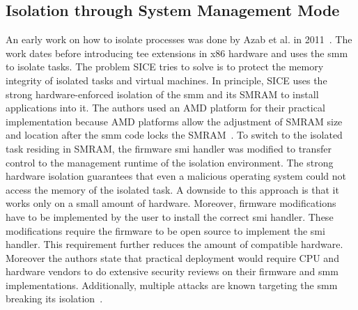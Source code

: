 \subsection{Isolation through System Management Mode}
\label{sec:20:isolation_smm}
An early work on how to isolate processes was done by Azab et al. in
2011~\cite{azab_sice_2011}. The work dates before introducing \gls{tee}
extensions in x86 hardware and uses the \gls{smm} to isolate tasks. The problem
SICE tries to solve is to protect the memory integrity of isolated tasks and
virtual machines. In principle, SICE uses the strong hardware-enforced isolation
of the \gls{smm} and its SMRAM to install applications into it. The authors used
an AMD platform for their practical implementation because AMD platforms allow
the adjustment of SMRAM size and location after the \gls{smm} code locks the
SMRAM~\cite{bios2014amd}. To switch to the isolated task residing in SMRAM, the
firmware \gls{smi} handler was modified to transfer control to the management
runtime of the isolation environment. The strong hardware isolation guarantees
that even a malicious operating system could not access the memory of the
isolated task. A downside to this approach is that it works only on a small
amount of hardware. Moreover, firmware modifications have to be implemented by
the user to install the correct \gls{smi} handler. These modifications require
the firmware to be open source to implement the \gls{smi} handler. This
requirement further reduces the amount of compatible hardware.
Moreover the authors state that practical deployment would require CPU and
hardware vendors to do extensive security reviews on their firmware and
\gls{smm} implementations. Additionally, multiple attacks are known targeting
the \gls{smm} breaking its isolation~\cite{wojtczuk2014attacking,
wojtczuk2009attacking, wojtczuk2009poisining}.

